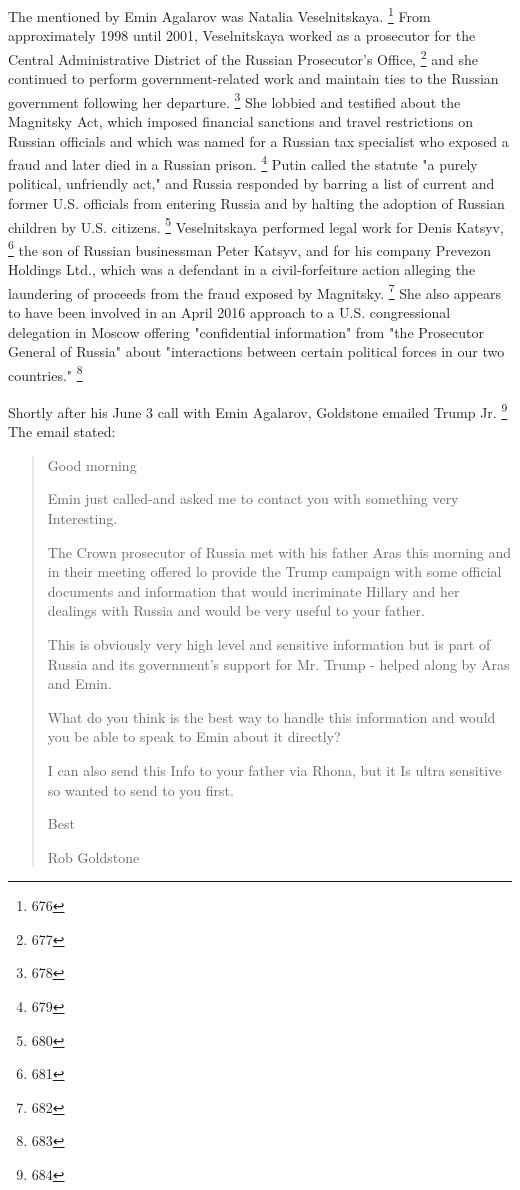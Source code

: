 The  mentioned by Emin Agalarov was Natalia Veselnitskaya.%
\footnote{676}
From approximately 1998 until 2001, Veselnitskaya worked as a prosecutor for the Central Administrative District of the Russian Prosecutor's Office,%
\footnote{677}
and she continued to perform government-related work and maintain ties to the Russian government following her departure.%
\footnote{678}
She lobbied and testified about the Magnitsky Act, which imposed financial sanctions and travel restrictions on Russian officials and which was named for a Russian tax specialist who exposed a fraud and later died in a Russian prison.%
\footnote{679}
Putin called the statute "a purely political, unfriendly act," and Russia responded by barring a list of current and former U.S. officials from entering Russia and by halting the adoption of Russian children by U.S. citizens.%
\footnote{680}
Veselnitskaya performed legal work for Denis Katsyv,%
\footnote{681}
the son of Russian businessman Peter Katsyv, and for his company Prevezon Holdings Ltd., which was a defendant in a civil-forfeiture action alleging the laundering of proceeds from the fraud exposed by Magnitsky.%
\footnote{682}
She also appears to have been involved in an April 2016 approach to a U.S. congressional delegation in Moscow offering "confidential information" from "the Prosecutor General of Russia" about "interactions between certain political forces in our two countries."%
\footnote{683}

Shortly after his June 3 call with Emin Agalarov, Goldstone emailed Trump Jr.%
\footnote{684}
The email stated:

\begin{quote}
Good morning

Emin just called-and asked me to contact you with something very Interesting.

The Crown prosecutor of Russia met with his father Aras this morning and in their meeting offered lo provide the Trump campaign with some official documents and information that would incriminate Hillary and her dealings with Russia and would be very useful to your father.

This is obviously very high level and sensitive information but is part of Russia and its government's support for Mr. Trump - helped along by Aras and Emin.

What do you think is the best way to handle this information and would you be able to speak to Emin about it directly?

I can also send this Info to your father via Rhona, but it Is ultra sensitive so wanted to send to you first.

Best

Rob Goldstone
\end{quote}

